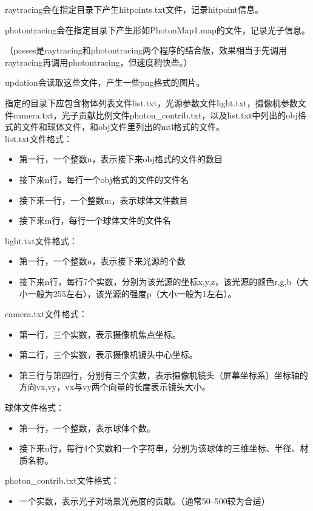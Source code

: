\documentclass[a4paper,12pt]{article}
\theoremstyle{plain}
\numberwithin{thmdef}{section}
\begin{document}
raytracing会在指定目录下产生hitpoints.txt文件，记录hitpoint信息。\par
photontracing会在指定目录下产生形如PhotonMap1.map的文件，记录光子信息。\par
（passes是raytracing和photontracing两个程序的结合版，效果相当于先调用raytracing再调用photontracing，但速度稍快些。）\par
updation会读取这些文件，产生一些png格式的图片。\par
指定的目录下应包含物体列表文件list.txt，光源参数文件light.txt，摄像机参数文件camera.txt，光子贡献比例文件photon\_contrib.txt，以及list.txt中列出的obj格式的文件和球体文件，和obj文件里列出的mtl格式的文件。
\vspace{10pt}\\
list.txt文件格式：
\begin{itemize}
    \small \setlength{\itemsep}{.1em}
    \item 第一行，一个整数n，表示接下来obj格式的文件的数目
    \item 接下来n行，每行一个obj格式的文件的文件名
    \item 接下来一行，一个整数m，表示球体文件数目
    \item 接下来m行，每行一个球体文件的文件名
\end{itemize}
light.txt文件格式：
\begin{itemize}
    \small \setlength{\itemsep}{.1em}
    \item 第一行，一个整数n，表示接下来光源的个数
    \item 接下来n行，每行7个实数，分别为该光源的坐标x,y,z，该光源的颜色r,g,b（大小一般为255左右），该光源的强度p（大小一般为1左右）。
\end{itemize}
camera.txt文件格式：
\begin{itemize}
    \small \setlength{\itemsep}{.1em}
    \item 第一行，三个实数，表示摄像机焦点坐标。
    \item 第二行，三个实数，表示摄像机镜头中心坐标。
    \item 第三行与第四行，分别有三个实数，表示摄像机镜头（屏幕坐标系）坐标轴的方向vx,vy，vx与vy两个向量的长度表示镜头大小。
\end{itemize}
球体文件格式：
\begin{itemize}
    \small \setlength{\itemsep}{.1em}
    \item 第一行，一个整数，表示球体个数。
    \item 接下来n行，每行4个实数和一个字符串，分别为该球体的三维坐标、半径、材质名称。
\end{itemize}
photon\_contrib.txt文件格式：
\begin{itemize}
    \small \setlength{\itemsep}{.1em}
    \item 一个实数，表示光子对场景光亮度的贡献。（通常50--500较为合适）
\end{itemize}
\end{document}
